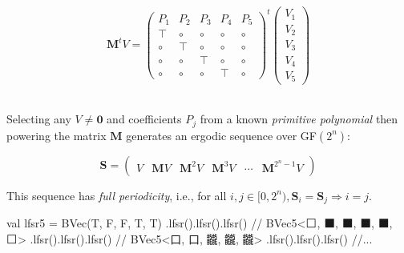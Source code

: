 \documentclass[portrait,a0b,final,a4resizeable]{a0poster}
\def\jointspacing{\vspace{0.3in}}
\begin{document}
\begin{poster}
\begin{multicols}{2}
      \[
        \mathbf{M}^tV = \begin{pmatrix}
                          P_1 & P_2 & P_3 & P_4 & P_5 \\
                          \top & \circ & \circ & \circ & \circ \\
                          \circ & \top & \circ & \circ & \circ \\
                          \circ & \circ & \top & \circ & \circ \\
                          \circ & \circ & \circ & \top & \circ
        \end{pmatrix}^t
        \begin{pmatrix}
          V_1 \\
          V_2 \\
          V_3 \\
          V_4 \\
          V_5
        \end{pmatrix}
      \]\\

      \hspace*{3cm}\begin{minipage}[c]{0.90\columnwidth}
      Selecting any $V \neq \mathbf{0}$ and coefficients $P_j$ from a known \textit{primitive polynomial} then powering the matrix $\mathbf{M}$ generates an ergodic sequence over GF$(2^n)$:\\
      \end{minipage}

      \[
        \mathbf{S} = \begin{pmatrix}V & \mathbf{M}V & \mathbf{M}^{2}V & \mathbf{M}^{3}V & \cdots & \mathbf{M}^{2^n-1}V \end{pmatrix}
      \]

      \hspace*{3cm}\begin{minipage}[c]{0.90\columnwidth}
      This sequence has \textit{full periodicity}, i.e., for all $i, j \in [0, 2^n), \mathbf{S}_i = \mathbf{S}_j \Rightarrow i = j$.
      \end{minipage}

      \jointspacing


      \null\hspace*{2cm}\begin{minipage}[c]{0.90\columnwidth}
\begin{kotlinlisting}
val lfsr5 = BVec(T, F, F, T, T)
  .lfsr().lfsr().lfsr() // BVec5<⬜, ⬛, ⬛, ⬛, ⬛, ⬜>
  .lfsr().lfsr().lfsr() // BVec5<口, 口, 龖, 龖, 龖>
  .lfsr().lfsr().lfsr() //...
\end{kotlinlisting}
      \end{minipage}


\end{multicols}
\end{poster}
\end{document}
